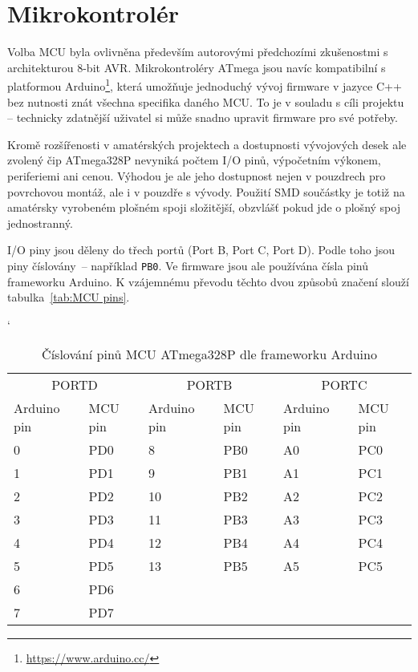 \section{Mikrokontrolér}
Volba MCU byla ovlivněna především autorovými předchozími zkušenostmi
s architekturou 8-bit AVR. Mikrokontroléry ATmega jsou navíc kompatibilní
s platformou Arduino\footnote{\url{https://www.arduino.cc/}}, která umožňuje
jednoduchý vývoj firmware v jazyce C++ bez nutnosti znát všechna specifika
daného MCU. To je v souladu s cíli projektu -- technicky zdatnější uživatel si
může snadno upravit firmware pro své potřeby.

Kromě rozšířenosti v amatérských projektech a dostupnosti vývojových desek ale
zvolený čip ATmega328P nevyniká počtem I/O pinů, výpočetním výkonem,
periferiemi ani cenou. Výhodou je ale jeho dostupnost nejen v pouzdrech pro
povrchovou montáž, ale i v pouzdře s vývody. Použití SMD součástky je totiž na
amatérsky vyrobeném plošném spoji složitější, obzvlášť pokud jde o plošný spoj
jednostranný.

\nocite{dshATmega328} %

I/O piny jsou děleny do třech portů (Port B, Port C, Port D). Podle toho jsou
piny číslovány~-- například \texttt{PB0}. Ve firmware jsou ale používána čísla
pinů frameworku Arduino. K vzájemnému převodu těchto dvou způsobů značení
slouží tabulka~\vref{tab:MCU pins}.

\begin{table}[htb]
    \centering
    \caption{%
        Číslování pinů MCU ATmega328P dle frameworku Arduino%
    }
    \label{tab:MCU pins}
    \catcode`
    \begin{tabular}{*{3}{ll}}
        \toprule
        \multicolumn{2}{c}{PORTD}
        & \multicolumn{2}{c}{PORTB}
        & \multicolumn{2}{c}{PORTC}
        \\
        \cmidrule(lr){1-2}
        \cmidrule(lr){3-4}
        \cmidrule(lr){5-6}
        Arduino pin     & MCU pin
        & Arduino pin     & MCU pin
        & Arduino pin     & MCU pin
        \\
        \midrule
        0   & PD0   & 8   & PB0   & A0  & PC0 \\
        1   & PD1   & 9   & PB1   & A1  & PC1 \\
        2   & PD2   & 10  & PB2   & A2  & PC2 \\
        3   & PD3   & 11  & PB3   & A3  & PC3 \\
        4   & PD4   & 12  & PB4   & A4  & PC4 \\
        5   & PD5   & 13  & PB5   & A5  & PC5 \\
        6   & PD6 \\
        7   & PD7 \\
        \bottomrule
    \end{tabular}
\end{table}
